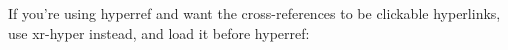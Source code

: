 %

% 

If you're using hyperref and want the cross-references to be clickable hyperlinks, use xr-hyper instead, and load it before hyperref:

\usepackage{xr-hyper}
\usepackage{hyperref}

%

